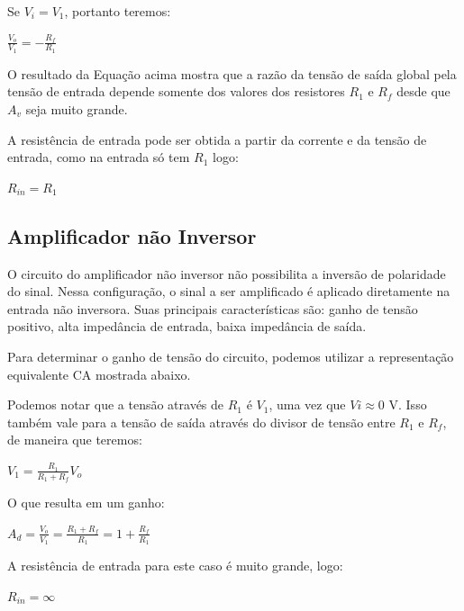 Se $V_i = V_1$, portanto teremos:

\begin{center}
    $\frac{V_o}{V_1} = -\frac{ R_f}{R_1} $
\end{center}


O resultado da Equação acima mostra que a razão da tensão de saída global pela tensão de entrada depende somente dos valores dos resistores $R_1$ e $R_f$ desde que $A_v$ seja muito grande.


A resistência de entrada pode ser obtida a partir da corrente e da tensão de entrada, como na entrada só tem $R_1$ logo:

\begin{center}
    $R_{in} = R_1 $
\end{center}



\subsection{Amplificador não Inversor}

O circuito do amplificador não inversor não possibilita a inversão de polaridade do sinal. Nessa configuração, o sinal a ser amplificado é aplicado diretamente na entrada não inversora. Suas principais características são: ganho de tensão positivo, alta impedância de entrada, baixa impedância de saída.


Para determinar o ganho de tensão do circuito, podemos utilizar a representação equivalente CA mostrada abaixo.




Podemos notar que a tensão através de $R_1$ é $V_1$, uma vez que $Vi ≈ 0$ V. Isso também vale para a tensão de saída através do divisor de tensão entre $R_1$ e $R_f$, de maneira que teremos:

\begin{center}
    $V_{1} = \frac{R_1}{R_1+R_f}V_o  $
\end{center}

O que resulta em um ganho:

\begin{center}
    $A_d = \frac{V_o}{V_1} = \frac{R_1+R_f}{R_1} = 1+\frac{R_f}{R_1} $
\end{center}

A resistência de entrada para este caso é muito grande, logo:

\begin{center}
    $R_{in} = \infty $
\end{center}


